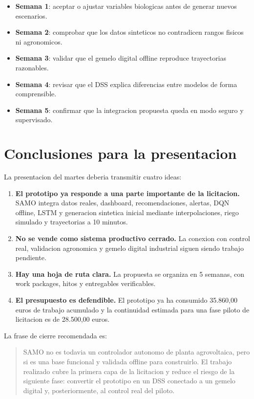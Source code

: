 ﻿\documentclass[11pt,a4paper]{article}
\begin{document}
\begin{itemize}
    \item \textbf{Semana 1}: aceptar o ajustar variables biologicas antes de generar nuevos escenarios.
    \item \textbf{Semana 2}: comprobar que los datos sinteticos no contradicen rangos fisicos ni agronomicos.
    \item \textbf{Semana 3}: validar que el gemelo digital offline reproduce trayectorias razonables.
    \item \textbf{Semana 4}: revisar que el DSS explica diferencias entre modelos de forma comprensible.
    \item \textbf{Semana 5}: confirmar que la integracion propuesta queda en modo seguro y supervisado.
\end{itemize}

\newpage

\section{Conclusiones para la presentacion}

La presentacion del martes deberia transmitir cuatro ideas:

\begin{enumerate}
    \item \textbf{El prototipo ya responde a una parte importante de la licitacion.} SAMO integra datos reales, dashboard, recomendaciones, alertas, DQN offline, LSTM y generacion sintetica inicial mediante interpolaciones, riego simulado y trayectorias a 10 minutos.
    \item \textbf{No se vende como sistema productivo cerrado.} La conexion con control real, validacion agronomica y gemelo digital industrial siguen siendo trabajo pendiente.
    \item \textbf{Hay una hoja de ruta clara.} La propuesta se organiza en 5 semanas, con work packages, hitos y entregables verificables.
    \item \textbf{El presupuesto es defendible.} El prototipo ya ha consumido 35.860,00 euros de trabajo acumulado y la continuidad estimada para una fase piloto de licitacion es de 28.500,00 euros.
\end{enumerate}

La frase de cierre recomendada es:

\begin{quote}
SAMO no es todavia un controlador autonomo de planta agrovoltaica, pero si es una base funcional y validada offline para construirlo. El trabajo realizado cubre la primera capa de la licitacion y reduce el riesgo de la siguiente fase: convertir el prototipo en un DSS conectado a un gemelo digital y, posteriormente, al control real del piloto.
\end{quote}
\end{document}
